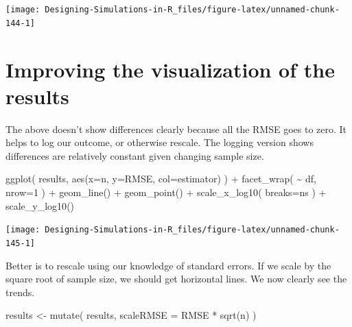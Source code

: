 \documentclass[
]{book}
\newenvironment{Shaded}{\begin{snugshade}}{\end{snugshade}}
\newcommand{\AttributeTok}[1]{\textcolor[rgb]{0.77,0.63,0.00}{#1}}
\newcommand{\DecValTok}[1]{\textcolor[rgb]{0.00,0.00,0.81}{#1}}
\newcommand{\FunctionTok}[1]{\textcolor[rgb]{0.00,0.00,0.00}{#1}}
\newcommand{\NormalTok}[1]{#1}
\newcommand{\OtherTok}[1]{\textcolor[rgb]{0.56,0.35,0.01}{#1}}
\newcommand{\SpecialCharTok}[1]{\textcolor[rgb]{0.00,0.00,0.00}{#1}}
\begin{document}
\begin{center}\texttt{[image: Designing-Simulations-in-R\_files/figure-latex/unnamed-chunk-144-1]} \end{center}

\hypertarget{improving-the-visualization-of-the-results}{%
\section{Improving the visualization of the results}\label{improving-the-visualization-of-the-results}}

The above doesn't show differences clearly because all the RMSE goes to zero.
It helps to log our outcome, or otherwise rescale. The logging version shows
differences are relatively constant given changing sample size.

\begin{Shaded}
\begin{Highlighting}[]
\FunctionTok{ggplot}\NormalTok{( results, }\FunctionTok{aes}\NormalTok{(}\AttributeTok{x=}\NormalTok{n, }\AttributeTok{y=}\NormalTok{RMSE, }\AttributeTok{col=}\NormalTok{estimator) ) }\SpecialCharTok{+}
    \FunctionTok{facet\_wrap}\NormalTok{( }\SpecialCharTok{\textasciitilde{}}\NormalTok{ df, }\AttributeTok{nrow=}\DecValTok{1}\NormalTok{ ) }\SpecialCharTok{+}
    \FunctionTok{geom\_line}\NormalTok{() }\SpecialCharTok{+} \FunctionTok{geom\_point}\NormalTok{() }\SpecialCharTok{+}
    \FunctionTok{scale\_x\_log10}\NormalTok{( }\AttributeTok{breaks=}\NormalTok{ns ) }\SpecialCharTok{+}
    \FunctionTok{scale\_y\_log10}\NormalTok{()}
\end{Highlighting}
\end{Shaded}

\begin{center}\texttt{[image: Designing-Simulations-in-R\_files/figure-latex/unnamed-chunk-145-1]} \end{center}

Better is to rescale using our knowledge of standard errors. If we scale by
the square root of sample size, we should get horizontal lines. We now
clearly see the trends.

\begin{Shaded}
\begin{Highlighting}[]
\NormalTok{results }\OtherTok{\textless{}{-}} \FunctionTok{mutate}\NormalTok{( results, }\AttributeTok{scaleRMSE =}\NormalTok{ RMSE }\SpecialCharTok{*} \FunctionTok{sqrt}\NormalTok{(n) )}
\end{Highlighting}
\end{Shaded}
\end{document}
